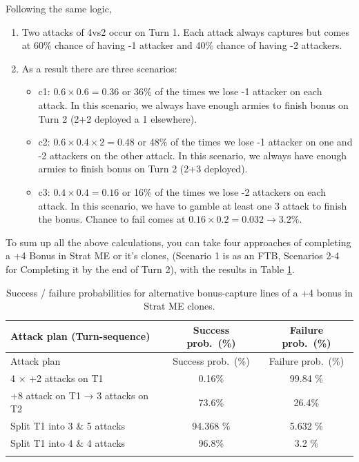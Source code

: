 Following the same logic, 
\begin{enumerate}
    \item Two attacks of 4vs2 occur on Turn 1. Each attack always captures but comes at 60\% chance of having -1 attacker and 40\% chance of having -2 attackers.
    \item As a result there are three scenarios:
    \begin{itemize}
        \item c1: $0.6\times0.6 = 0.36$ or 36\% of the times we lose -1 attacker on each attack. In this scenario, we always have enough armies to finish bonus on Turn 2 (2+2 deployed a 1 elsewhere).
        \item c2: $0.6\times0.4\times2  = 0.48$ or 48\% of the times we lose -1 attacker on one and -2 attackers on the other attack. In this scenario, we always have enough armies to finish bonus on Turn 2 (2+3 deployed).
        \item c3: $0.4\times0.4 = 0.16$ or 16\% of the times we lose -2 attackers on each attack. In this scenario, we have to gamble at least one 3 attack to finish the bonus. Chance to fail comes at $0.16\times 0.2 = 0.032 \rightarrow 3.2\%$. 
    \end{itemize}
\end{enumerate}

To sum up all the above calculations, you can take four approaches of completing a +4 Bonus in Strat ME or it's clones, (Scenario 1 is as an FTB, Scenarios 2-4 for Completing it by the end of Turn 2), with the results in Table \ref{table:bonus_break_probs}.

\begin{longtable}{|l|c|c|}
\hline
\rowcolor{Baby_Blue}
Attack plan (Turn-sequence) & Success prob.\ (\%) & Failure prob.\ (\%) \\ \hline\hline
\endfirsthead
\hline
\rowcolor{Baby_Blue}
Attack plan & Success prob.\ (\%) & Failure prob.\ (\%) \\ \hline\hline
\endhead
4 × +2 attacks on T1                & 0.16\% & 99.84 \% \\ \hline
+8 attack on T1 → 3 attacks on T2   & 73.6\% & 26.4\% \\ \hline
Split T1 into 3 \& 5 attacks         & 94.368 \% & 5.632 \% \\ \hline
Split T1 into 4 \& 4 attacks         & 96.8\% & 3.2 \% \\ \hline
\caption{Success / failure probabilities for alternative bonus-capture lines of a +4 bonus in Strat ME clones.}
\label{table:bonus_break_probs}
\end{longtable}


